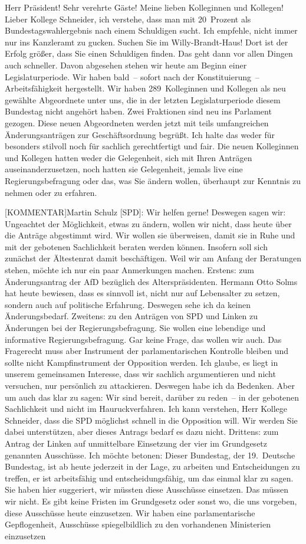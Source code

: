 \documentclass[a4paper,11pt]{article}
\begin{document}
Herr Präsident! Sehr verehrte Gäste! Meine lieben Kolleginnen und Kollegen! Lieber Kollege Schneider, ich verstehe, dass man mit 20 Prozent als Bundestagswahlergebnis nach einem Schuldigen sucht. Ich empfehle, nicht immer nur ins Kanzleramt zu gucken. Suchen Sie im Willy-Brandt-Haus! Dort ist der Erfolg größer, dass Sie einen Schuldigen finden. Das geht dann vor allen Dingen auch schneller. Davon abgesehen stehen wir heute am Beginn einer Legislaturperiode. Wir haben bald – sofort nach der Konstituierung – Arbeitsfähigkeit hergestellt. Wir haben 289 Kolleginnen und Kollegen als neu gewählte Abgeordnete unter uns, die in der letzten Legislaturperiode diesem Bundestag nicht angehört haben. Zwei Fraktionen sind neu ins Parlament gezogen. Diese neuen Abgeordneten werden jetzt mit teils umfangreichen Änderungsanträgen zur Geschäftsordnung begrüßt. Ich halte das weder für besonders stilvoll noch für sachlich gerechtfertigt und fair. Die neuen Kolleginnen und Kollegen hatten weder die Gelegenheit, sich mit Ihren Anträgen auseinanderzusetzen, noch hatten sie Gelegenheit, jemals live eine Regierungsbefragung oder das, was Sie ändern wollen, überhaupt zur Kenntnis zu nehmen oder zu erfahren.

[KOMMENTAR]Martin Schulz [SPD]: Wir helfen gerne!
 Deswegen sagen wir: Ungeachtet der Möglichkeit, etwas zu ändern, wollen wir nicht, dass heute über die Anträge abgestimmt wird. Wir wollen sie überweisen, damit sie in Ruhe und mit der gebotenen Sachlichkeit beraten werden können. Insofern soll sich zunächst der Ältestenrat damit beschäftigen. Weil wir am Anfang der Beratungen stehen, möchte ich nur ein paar Anmerkungen machen. Erstens: zum Änderungsantrag der AfD bezüglich des Alterspräsidenten. Hermann Otto Solms hat heute bewiesen, dass es sinnvoll ist, nicht nur auf Lebensalter zu setzen, sondern auch auf politische Erfahrung. Deswegen sehe ich da keinen Änderungsbedarf. Zweitens: zu den Anträgen von SPD und Linken zu Änderungen bei der Regierungsbefragung. Sie wollen eine lebendige und informative Regierungsbefragung. Gar keine Frage, das wollen wir auch. Das Fragerecht muss aber Instrument der parlamentarischen Kontrolle bleiben und sollte nicht Kampfinstrument der Opposition werden. Ich glaube, es liegt in unserem gemeinsamen Interesse, dass wir sachlich argumentieren und nicht versuchen, nur persönlich zu attackieren. Deswegen habe ich da Bedenken. Aber um auch das klar zu sagen: Wir sind bereit, darüber zu reden – in der gebotenen Sachlichkeit und nicht im Hauruckverfahren. Ich kann verstehen, Herr Kollege Schneider, dass die SPD möglichst schnell in die Opposition will. Wir werden Sie dabei unterstützen, aber dieses Antrags bedarf es dazu nicht. Drittens: zum Antrag der Linken auf unmittelbare Einsetzung der vier im Grundgesetz genannten Ausschüsse. Ich möchte betonen: Dieser Bundestag, der 19. Deutsche Bundestag, ist ab heute jederzeit in der Lage, zu arbeiten und Entscheidungen zu treffen, er ist arbeitsfähig und entscheidungsfähig, um das einmal klar zu sagen. Sie haben hier suggeriert, wir müssten diese Ausschüsse einsetzen. Das müssen wir nicht. Es gibt keine Fristen im Grundgesetz oder sonst wo, die uns vorgeben, diese Ausschüsse heute einzusetzen. Wir haben eine parlamentarische Gepflogenheit, Ausschüsse spiegelbildlich zu den vorhandenen Ministerien einzusetzen
\end{document}
